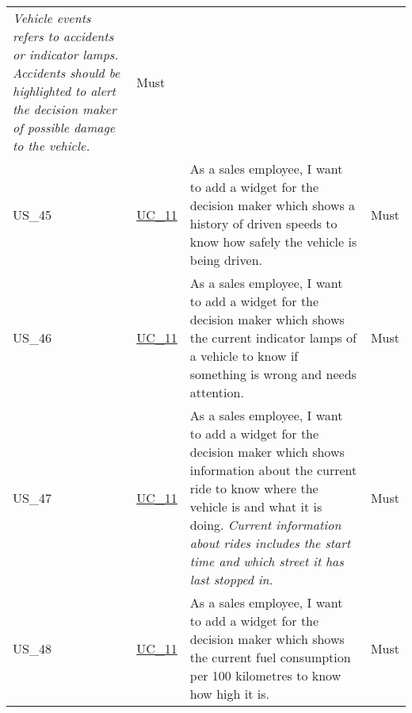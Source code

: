 \begin{footnotesize}
\begin{longtable}[L L L]{ p{} p{} p{} p{} }
      \newline
      \emph{Vehicle events refers to accidents or indicator lamps. Accidents should be highlighted to alert the decision maker of possible damage to the vehicle.} & Must
      \\
      \hypertarget{Ref:US45}{US\_45} & \hyperlink{Ref:UC11}{UC\_11} & As a sales employee, I want to add a \gls{widget} for the decision maker which shows a history of driven speeds to know how safely the vehicle is being driven. & Must \\
      \hypertarget{Ref:US46}{US\_46} & \hyperlink{Ref:UC11}{UC\_11} & As a sales employee, I want to add a \gls{widget} for the decision maker which shows the current indicator lamps of a vehicle to know if something is wrong and needs attention. & Must \\
      \hypertarget{Ref:US47}{US\_47} & \hyperlink{Ref:UC11}{UC\_11} & As a sales employee, I want to add a \gls{widget} for the decision maker which shows information about the current ride to know where the vehicle is and what it is doing.
      \newline
      \emph{Current information about rides includes the start time and which street it has last stopped in.} & Must \\
      \hypertarget{Ref:US48}{US\_48} & \hyperlink{Ref:UC11}{UC\_11} & As a sales employee, I want to add a \gls{widget} for the decision maker which shows the current fuel consumption per 100 kilometres to know how high it is. & Must \\

      \bottomrule
    \end{longtable}
  \end{footnotesize}
  \rmfamily


